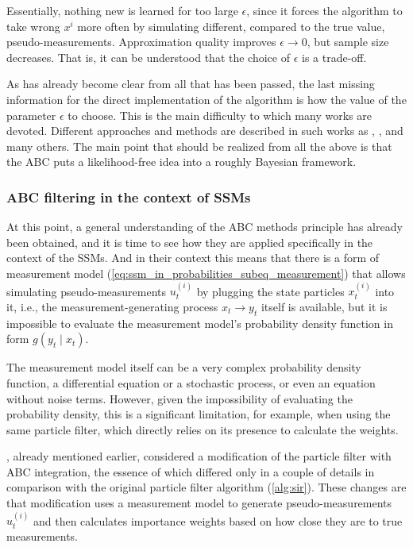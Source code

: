 Essentially, nothing new is learned for too large \(\epsilon\), since it forces the algorithm to take wrong \(x^{i}\) more often by simulating different, compared to the true value, pseudo-measurements. Approximation quality improves \(\epsilon \rightarrow 0\), but sample size decreases. That is, it can be understood that the choice of \(\epsilon\) is a trade-off.

As has already become clear from all that has been passed, the last missing information for the direct implementation of the algorithm is how the value of the parameter \(\epsilon\) to choose. This is the main difficulty to which many works are devoted. Different approaches and methods are described in such works as \cite{jasra_filtering_2012}, \cite{dedecius_adaptive_2017}, and many others. The main point that should be realized from all the above is that the ABC puts a likelihood-free idea into a roughly Bayesian framework.

\subsubsection{ABC filtering in the context of SSMs}
At this point, a general understanding of the ABC methods principle has already been obtained, and it is time to see how they are applied specifically in the context of the SSMs. And in their context this means that there is a form of measurement model (\ref{eq:ssm_in_probabilities_subeq_measurement}) that allows simulating pseudo-measurements \(u_t^{(i)}\) by plugging the state particles \(x_t^{(i)}\) into it, i.e., the measurement-generating process \(x_t \rightarrow y_t\) itself is available, but it is impossible to evaluate the measurement model's probability density function in form \(g\left(y_t  \mid  x_t\right)\).

The measurement model itself can be a very complex probability density function, a differential equation or a stochastic process, or even an equation without noise terms. However, given the impossibility of evaluating the probability density, this is a significant limitation, for example, when using the same particle filter, which directly relies on its presence to calculate the weights.

\cite{jasra_filtering_2012}, already mentioned earlier, considered a modification of the particle filter with ABC integration, the essence of which differed only in a couple of details in comparison with the original particle filter algorithm (\ref{alg:sir}). These changes are that modification uses a measurement model to generate pseudo-measurements \(u^{(i)}_t\) and then calculates importance weights based on how close they are to true measurements.

